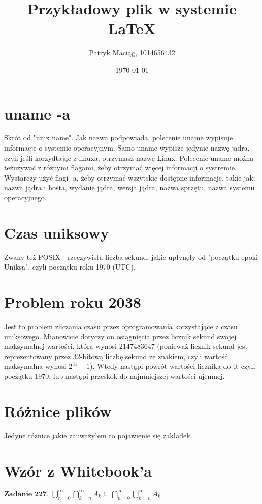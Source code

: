 \documentclass[a4paper]{article}
\author{Patryk Maciąg, 1014656432}
\title{Przykładowy plik w systemie \LaTeX}
\date{\today}
\begin{document}
\maketitle
\section{uname -a}
Skrót od "unix name". Jak nazwa podpowiada, polecenie uname wypisuje informacje o systemie operacyjnym. Samo uname wypisze jedynie nazwę jądra, czyli jeśli korzydtając z linuxa, otrzymasz nazwę Linux. Polecenie uname można teżużywać z różnymi flagami, żeby otrzymać więcej informacji o systremie. Wystarczy użyć flagi -a, żeby otrzymać wszytskie dostępne informacje, takie jak: nazwa jądra i hosta, wydanie jądra, wersja jądra, nazwa sprzętu, nazwa systemu operacyjnego.

\section{Czas uniksowy}
Zwany też POSIX - rzeczywista liczba sekund, jakie upłynęły od "początku epoki Uniksa", czyli początku roku 1970 (UTC). 
\section{Problem roku 2038}
Jest to problem zliczania czasu przez oprogramowania korzystające z czasu uniksowego. Mianowicie dotyczy on osiągnięcia przez licznik sekund swojej maksymalnej wartości, która wynosi \(2147483647\) (ponieważ licznik sekund jest reprezentowany przez 32-bitową liczbę sekund ze znakiem, czyli wartość maksymalna wynosi \(2^{31}-1\)). Wtedy nastąpi powrót wartości licznika do 0, czyli początku 1970, lub nastąpi przeskok do najmniejszej wartości ujemnej.
\section{Różnice plików}
Jedyne różnice jakie zauważyłem to pojawienie się zakładek.
\section{Wzór z Whitebook'a}
\(\textbf{Zadanie 227. } \bigcup_{n=0}^{\infty}\bigcap_{k=n}^{\infty} A_k\subseteq\bigcap_{n=0}^{\infty}\bigcup_{k=n}^{\infty} A_k\)
\end{document}
